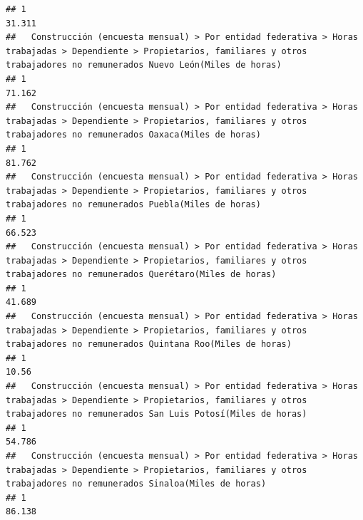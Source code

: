 \documentclass[
]{article}
\begin{document}
\begin{verbatim}
## 1                                                                                                                                                                            31.311
##   Construcción (encuesta mensual) > Por entidad federativa > Horas trabajadas > Dependiente > Propietarios, familiares y otros trabajadores no remunerados Nuevo León(Miles de horas) 
## 1                                                                                                                                                                               71.162
##   Construcción (encuesta mensual) > Por entidad federativa > Horas trabajadas > Dependiente > Propietarios, familiares y otros trabajadores no remunerados Oaxaca(Miles de horas) 
## 1                                                                                                                                                                           81.762
##   Construcción (encuesta mensual) > Por entidad federativa > Horas trabajadas > Dependiente > Propietarios, familiares y otros trabajadores no remunerados Puebla(Miles de horas) 
## 1                                                                                                                                                                           66.523
##   Construcción (encuesta mensual) > Por entidad federativa > Horas trabajadas > Dependiente > Propietarios, familiares y otros trabajadores no remunerados Querétaro(Miles de horas) 
## 1                                                                                                                                                                              41.689
##   Construcción (encuesta mensual) > Por entidad federativa > Horas trabajadas > Dependiente > Propietarios, familiares y otros trabajadores no remunerados Quintana Roo(Miles de horas) 
## 1                                                                                                                                                                                  10.56
##   Construcción (encuesta mensual) > Por entidad federativa > Horas trabajadas > Dependiente > Propietarios, familiares y otros trabajadores no remunerados San Luis Potosí(Miles de horas) 
## 1                                                                                                                                                                                    54.786
##   Construcción (encuesta mensual) > Por entidad federativa > Horas trabajadas > Dependiente > Propietarios, familiares y otros trabajadores no remunerados Sinaloa(Miles de horas) 
## 1                                                                                                                                                                            86.138

\end{verbatim}
\end{document}
